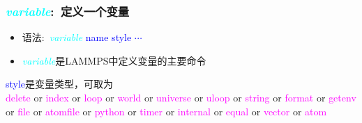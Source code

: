 \frame
{
	\frametitle{\textcolor{cyan}{\textit{variable}}:~定义一个变量}
	\begin{itemize}
		\item 语法:~\textcolor{cyan}{\textit{variable}} \textrm{\textcolor{blue}{name style $\cdots$}}\\
			{\fontsize{7.5pt}{5.2pt}}
		\item \textcolor{cyan}{\textit{variable}}是\textrm{LAMMPS}中定义变量的主要命令\\
			{\fontsize{7.5pt}{5.2pt}}
	\end{itemize}
			\textrm{\textcolor{blue}{style}}是变量类型，可取为\\
			\textrm{\textcolor{magenta}{delete} or \textcolor{magenta}{index} or \textcolor{magenta}{loop} or \textcolor{magenta}{world} or \textcolor{magenta}{universe} or \textcolor{magenta}{uloop} or \textcolor{magenta}{string} or \textcolor{magenta}{format} or \textcolor{magenta}{getenv} or \textcolor{magenta}{file} or \textcolor{magenta}{atomfile} or \textcolor{magenta}{python} or \textcolor{magenta}{timer} or \textcolor{magenta}{internal} or \textcolor{magenta}{equal} or \textcolor{magenta}{vector} or \textcolor{magenta}{atom}}
			\vskip 3pt
{\fontsize{7.5pt}{5.2pt}\selectfont{常用的变量类型:}}
	\begin{itemize}
{\fontsize{7.5pt}{5.2pt}}
	\end{itemize}
}

